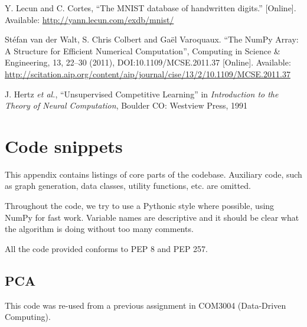 \documentclass[a4paper, 11pt, twocolumn, final]{article} %
\begin{document}
\begin{thebibliography}{9}
  Y. Lecun and C. Cortes,
  ``The MNIST database of handwritten digits.''
  [Online].
  Available: \url{http://yann.lecun.com/exdb/mnist/}

  Stéfan van der Walt, S. Chris Colbert and Gaël Varoquaux.
  ``The NumPy Array: A Structure for Efficient Numerical Computation'',
  Computing in Science \& Engineering, 13, 22--30 (2011),
  DOI:10.1109/MCSE.2011.37
  [Online].
  Available: \url{http://scitation.aip.org/content/aip/journal/cise/13/2/10.1109/MCSE.2011.37}

  J. Hertz \textit{et al.},
  ``Unsupervised Competitive Learning''
  in \textit{Introduction to the Theory of Neural Computation},
  Boulder CO: Westview Press,
  1991

\end{thebibliography}

\onecolumn \appendix \section{Code snippets} \label{sec:code} This appendix
contains listings of core parts of the codebase.  Auxiliary code, such as graph
generation, data classes, utility functions, etc. are omitted.

Throughout the code, we try to use a Pythonic style where possible, using NumPy
for fast work. Variable names are descriptive and it should be clear what the
algorithm is doing without too many comments.

All the code provided conforms to PEP 8 and PEP 257.

\subsection{PCA} This code was re-used from a previous assignment in COM3004
(Data-Driven Computing).
\end{document}
